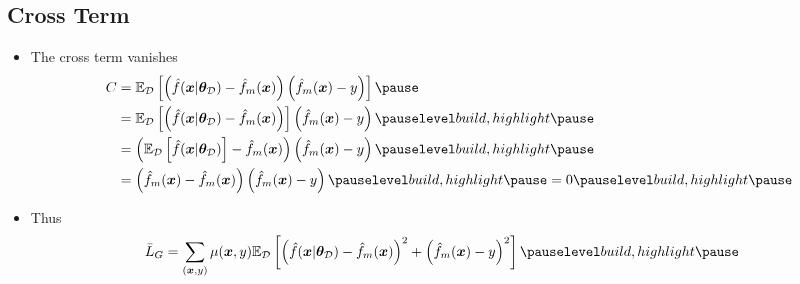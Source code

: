 \begin{slide}
\section{Cross Term}

\begin{PauseHighLight}
  \begin{itemize}
  \item The cross term vanishes
  \begin{align*}
  C &= \av[\mathcal{D}]{ \left(\hat{f}(\bm{x}\vert \bm{\theta}_{\mathcal{D}}) -
              \hat{f}_m(\bm{x}) \right) \left(\hat{f}_m(\bm{x}) - y \right) }\pause\\
     &= \av[\mathcal{D}]{ \left(\hat{f}(\bm{x}\vert \bm{\theta}_{\mathcal{D}}) -
              \hat{f}_m(\bm{x}) \right) } \left( \hat{f}_m(\bm{x}) - y \right) \pauseb\\
    &= \left(\av[\mathcal{D}]{\hat{f}(\bm{x}\vert \bm{\theta}_{\mathcal{D}})} -
              \hat{f}_m(\bm{x}) \right) \left(\hat{f}_m(\bm{x}) - y \right)\pauseb\\
     &= \left(\hat{f}_m(\bm{x}) -
              \hat{f}_m(\bm{x}) \right)\left(
              \hat{f}_m(\bm{x}) - y \right)\pauseb
              = 0\pauseb
  \end{align*}
  \item Thus
  \begin{align*}
   \bar{L}_G &= \sum_{(\bm{x},y)} \mu(\bm{x},y)
              \av[\mathcal{D}]{ 
              \left(\hat{f}(\bm{x}\vert \bm{\theta}_{\mathcal{D}}) -
              \hat{f}_m(\bm{x}) \right)^2 + \left(
              \hat{f}_m(\bm{x}) - y \right)^2 }\pauseb
  \end{align*}
  \end{itemize}
\end{PauseHighLight}

\end{slide}




